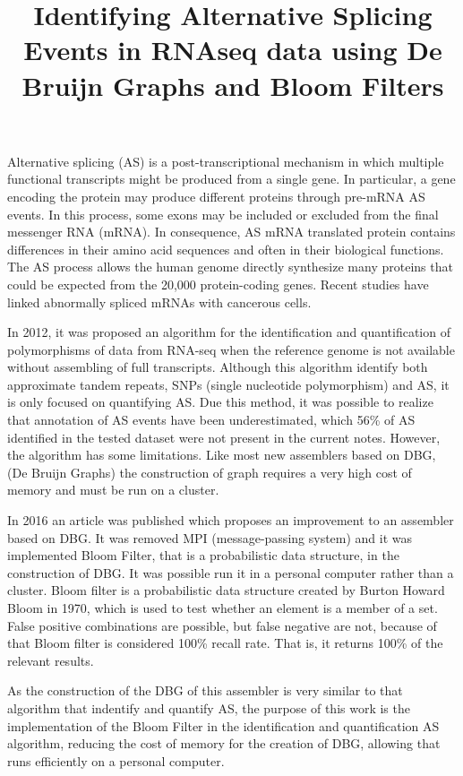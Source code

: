 \documentclass[10pt,twoside]{article}
\title{\vspace{-15mm}\fontsize{24pt}{10pt}\selectfont\textbf{Identifying Alternative Splicing Events in RNAseq data using De Bruijn Graphs and Bloom Filters}} %
\author{}
\affil{}
\date{}
\begin{document}
\maketitle %
\thispagestyle{fancy} %


Alternative splicing (AS) is a post-transcriptional mechanism in which multiple functional transcripts might be produced from a single gene. In particular, a gene encoding the protein may produce different proteins through pre-mRNA AS events. In this process, some exons may be included or excluded from the final messenger RNA (mRNA). In consequence, AS mRNA translated protein contains differences in their amino acid sequences and often in their biological functions. The AS process allows the human genome directly synthesize many proteins that could be expected from the 20,000 protein-coding genes. Recent studies have linked abnormally spliced mRNAs with cancerous cells.

In 2012, it was proposed an algorithm for the identification and quantification of polymorphisms of data from RNA-seq when the reference genome is not available without assembling of full transcripts. Although this algorithm identify both approximate tandem repeats, SNPs (single nucleotide polymorphism) and AS, it is only focused on quantifying AS. Due this method, it was possible to realize that annotation of AS events have been underestimated, which 56\% of AS identified in the tested dataset were not present in the current notes. However, the algorithm has some limitations. Like most new assemblers based on DBG, (De Bruijn Graphs) the construction of graph requires a very high cost of memory and must be run on a cluster.

In 2016 an article was published which proposes an improvement to an assembler based on DBG. It was removed MPI (message-passing system) and it was implemented Bloom Filter, that is a probabilistic data structure, in the construction of DBG. It was possible run it in a personal computer rather than a cluster. Bloom filter is a probabilistic data structure created by Burton Howard Bloom in 1970, which is used to test whether an element is a member of a set. False positive combinations are possible, but false negative are not, because of that Bloom filter is considered 100\% recall rate. That is, it returns 100\% of the relevant results.

As the construction of the DBG of this assembler is very similar to that algorithm that indentify and quantify AS, the purpose of this work is the implementation of the Bloom Filter in the identification and quantification AS algorithm, reducing the cost of memory for the creation of DBG, allowing that runs efficiently on a personal computer.
\end{document}
